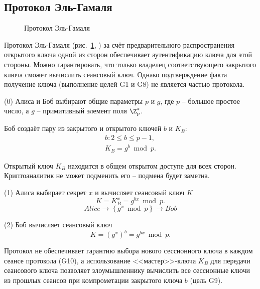 \subsection{Протокол Эль-Гамаля}

\begin{figure}
	\centering
	\begin{sequencediagram}

	\end{sequencediagram}
	\caption{Протокол Эль-Гамаля\label{fig:key_distribution-el-gamal}}
\end{figure}

Протокол Эль-Гамаля (рис.~\ref{fig:key_distribution-el-gamal}, \cite{ElGamal:1984, ElGamal:1985}) за счёт предварительного распространения открытого ключа одной из сторон обеспечивает аутентификацию ключа для этой стороны. Можно гарантировать, что только владелец соответствующего закрытого ключа сможет вычислить сеансовый ключ. Однако подтверждение факта получение ключа (выполнение целей G1 и G8) не является частью протокола.

\begin{protocol}
    \item[(0)] Алиса и Боб выбирают общие параметры $p$ и $g$, где $p$ -- большое простое число, а $g$ -- примитивный элемент поля $\Z_p^*$.
    \item[{}] Боб создаёт пару из закрытого и открытого ключей $b$ и $K_B$:
        \[\begin{array}{l}
            b: 2 \leq b \leq p - 1, \\
            K_B = g^b \bmod p.
        \end{array}\]
    \item[{}] Открытый ключ $K_B$ находится в общем открытом доступе для всех сторон. Криптоаналитик не может подменить его -- подмена будет заметна.
    \item[(1)] Алиса выбирает секрет $x$ и вычисляет сеансовый ключ $K$
        \[ K = K_B^{x} = g^{bx} \bmod p. \]
        \[ Alice \to \left\{ g^x \bmod p \right\} \to Bob\]
    \item[(2)] Боб вычисляет сеансовый ключ
        \[ K = (g^x)^{b} = g^{bx} \bmod p. \]
\end{protocol}

Протокол не обеспечивает гарантию выбора нового сессионного ключа в каждом сеансе протокола (G10), а использование <<мастер>>-ключа $K_B$ для передачи сеансового ключа позволяет злоумышленнику вычислить все сессионные ключи из прошлых сеансов при компрометации закрытого ключа $b$ (цель G9).

